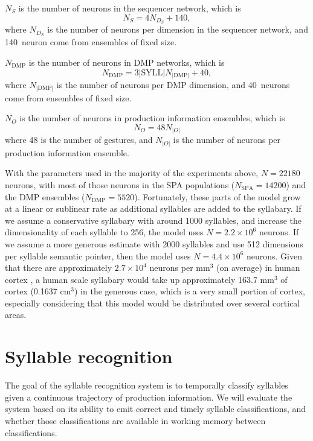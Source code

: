 $N_S$ is the number of neurons
in the sequencer network,
which is
\begin{equation}
  N_S = 4 N_D_S + 140,
\end{equation}
where $N_D_S$ is the number of neurons
per dimension in the sequencer network,
and 140~neuron come from ensembles
of fixed size.

$N_{\text{DMP}}$ is the number of neurons
in DMP networks, which is
\begin{equation}
  N_{\text{DMP}} = 3 |\text{SYLL}| N_{|\text{DMP}|} + 40,
\end{equation}
where $N_{|\text{DMP}|}$ is the number of neurons
per DMP dimension,
and 40~neurons come from ensembles of fixed size.

$N_O$ is the number of neurons
in production information ensembles, which is
\begin{equation}
  N_O = 48 N_{|O|}
\end{equation}
where 48 is the number of gestures,
and $N_{|O|}$ is the number of neurons
per production information ensemble.

With the parameters used
in the majority of the experiments above,
$N=22180$ neurons,
with most of those neurons
in the SPA populations
($N_{\text{SPA}}=14200$)
and the DMP ensembles ($N_{\text{DMP}}=5520$).
Fortunately, these parts of the model
grow at a linear or sublinear rate
as additional syllables are added
to the syllabary.
If we assume a conservative syllabary
with around 1000 syllables,
and increase the dimensionality
of each syllable to 256,
the model uses
$N=2.2 \times 10^6$ neurons.
If we assume a more generous estimate
with 2000 syllables
and use 512 dimensions
per syllable semantic pointer,
then the model uses
$N=4.4 \times 10^6$ neurons.
Given that there are approximately
$2.7 \times 10^4$ neurons per mm$^3$ (on average)
in human cortex \citep[BNID 112050]{milo2010},
a human scale syllabary would take up
approximately 163.7 mm$^3$ of cortex
(0.1637 cm$^3$)
in the generous case,
which is a very small portion of cortex,
especially considering that this model
would be distributed over
several cortical areas.

\section{Syllable recognition}

The goal of the syllable recognition system
is to temporally classify syllables
given a continuous trajectory
of production information.
We will evaluate the system
based on its ability to emit
correct and timely syllable classifications,
and whether those classifications
are available in working memory
between classifications.

